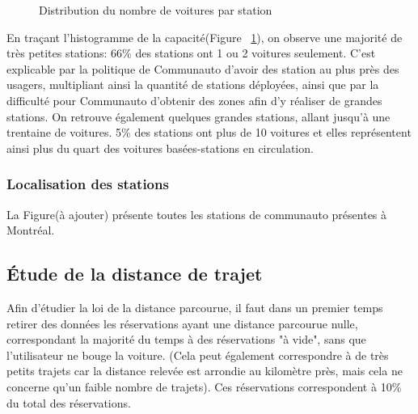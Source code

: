 \documentclass[12pt,a4paper]{article}
\newcommand{\1}[1]{\mathbbm{1}_{\{#1\}} }
\theoremstyle{definition}
\begin{document}
{\begin{figure}[!h]
\centering
{}
\caption{Distribution du nombre de voitures par station}
\label{hist_capa}
\end{figure}


En traçant l'histogramme de la capacité(Figure~ \ref{hist_capa}), on observe une majorité de très petites stations: 66\% des stations ont 1 ou 2 voitures seulement. C'est explicable par la politique de Communauto d'avoir des station au plus près des usagers, multipliant ainsi la quantité de stations déployées, ainsi que par la difficulté pour Communauto d'obtenir des zones afin d'y réaliser de grandes stations.
On retrouve également quelques grandes stations, allant jusqu'à une trentaine de voitures. 5\% des stations ont plus de 10 voitures et elles représentent ainsi plus du quart des voitures basées-stations en circulation.

\subsubsection{Localisation des stations}

La Figure(à ajouter) présente toutes les stations de communauto présentes à Montréal.

\subsection{Étude de la distance de trajet}


Afin d'étudier la loi de la distance parcourue, il faut dans un premier temps retirer des données les réservations ayant une distance parcourue nulle, correspondant la majorité du temps à des réservations "à vide", sans que l'utilisateur ne bouge la voiture. (Cela peut également correspondre à de très petits trajets car la distance relevée est arrondie au kilomètre près, mais cela ne concerne qu'un faible nombre de trajets). Ces réservations correspondent à 10\% du total des réservations.

}
\end{document}
